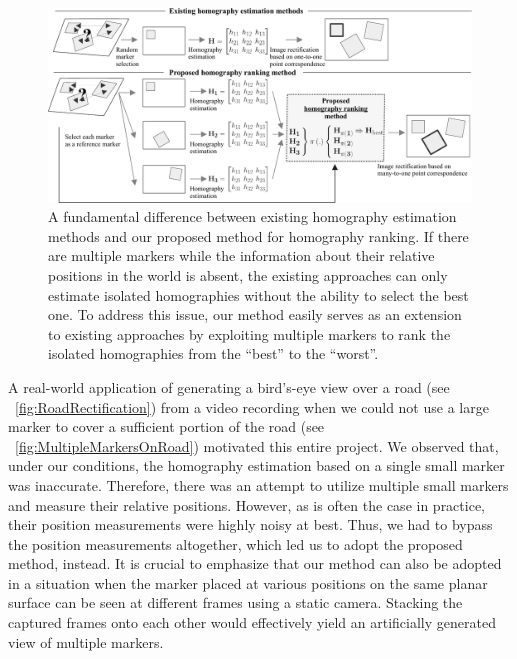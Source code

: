 \begin{figure}[t]
  \centerline{\includegraphics[width=\linewidth]{figures/homography/motivation_diagram.pdf}}
  \caption[Homography ranking motivation diagram]{A fundamental difference between existing homography estimation methods and our proposed method for homography ranking. If there are multiple markers while the information about their relative positions in the world is absent, the existing approaches can only estimate isolated homographies without the ability to select the best one. To address this issue, our method easily serves as an extension to existing approaches by exploiting multiple markers to rank the isolated homographies from the ``best'' to the ``worst''.}
  \label{fig:HomographyMotivationDiagram}
\end{figure}

A real-world application of generating a bird's-eye view over a road (see \figstr{}~\ref{fig:RoadRectification}) from a video recording when we could not use a large marker to cover a sufficient portion of the road (see \figstr{}~\ref{fig:MultipleMarkersOnRoad}) motivated this entire project. We observed that, under our conditions, the homography estimation based on a single small marker was inaccurate. Therefore, there was an attempt to utilize multiple small markers and measure their relative positions. However, as is often the case in practice, their position measurements were highly noisy at best. Thus, we had to bypass the position measurements altogether, which led us to adopt the proposed method, instead. It is crucial to emphasize that our method can also be adopted in a situation when the marker placed at various positions on the same planar surface can be seen at different frames using a static camera. Stacking the captured frames onto each other would effectively yield an artificially generated view of multiple markers.

